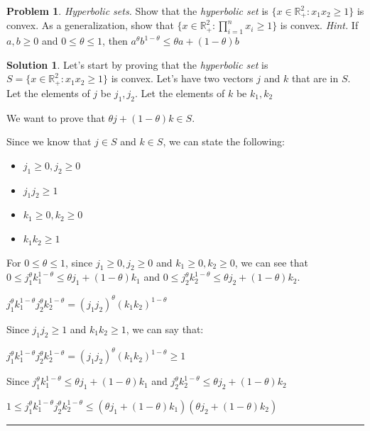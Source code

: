 \documentclass{article}
\theoremstyle{definition}
\newtheorem{problem}{Problem}
\def\fline{\rule{0.75\linewidth}{0.5pt}}
\newcommand{\finishline}{\begin{center}\fline\end{center}}
\newtheorem*{solution*}{Solution}
\newenvironment{solution}{\begin{solution*}}{{\finishline} \end{solution*}}
\begin{document}
\begin{problem}
    \textit{Hyperbolic sets.} Show that the \textit{hyperbolic set} is $\{x \in \mathbb{R}^2_+ : x_1x_2 \geq 1\}$ is convex. As a generalization, show that $\{x \in \mathbb{R}^2_+ : \prod_{i=1}^{n} x_i \geq 1\}$ is convex. \textit{Hint.} If $a, b \geq 0$ and $0 \leq \theta \leq 1$, then $a^{\theta} b^{1 - \theta} \leq \theta a + (1 - \theta) b$

    \begin{solution}

    Let's start by proving that the \textit{hyperbolic set} is $S = \{x \in \mathbb{R}^2_+ : x_1x_2 \geq 1\}$ is convex. \newline 
Let's have two vectors  $j$ and $k$ that are in $S$. Let the elements of $j$ be $j_1, j_2$. Let the elements of $k$ be $k_1, k_2$

We want to prove that $\theta j + (1 - \theta)k \in S$. 

        Since we know that $j \in S$ and $k \in S$, we can state the following:
        \begin{itemize}
            \item $j_1 \geq 0, j_2 \geq 0$
            \item $j_1 j_2 \geq 1$
            \item $k_1 \geq 0, k_2 \geq 0$
            \item $k_1 k_2 \geq 1$
        \end{itemize}

    For $0 \leq \theta \leq 1$, since $j_1 \geq 0, j_2 \geq 0$ and $k_1 \geq 0, k_2 \geq 0$, we can see that $0 \leq j_1^{\theta} k_1^{1 - \theta} \leq \theta j_1 + (1 - \theta)k_1$ and $0 \leq j_2^{\theta} k_2^{1 - \theta} \leq \theta j_2 + (1 - \theta)k_2$. 

    $j_1^{\theta} k_1^{1 - \theta} j_2^{\theta} k_2^{1 - \theta} = (j_1 j_2)^{\theta} (k_1 k_2)^{1 - \theta} $

    Since $j_1 j_2 \geq 1$ and $k_1 k_2 \geq 1$, we can say that: \newline 

    $j_1^{\theta} k_1^{1 - \theta} j_2^{\theta} k_2^{1 - \theta} = (j_1 j_2)^{\theta} (k_1 k_2)^{1 - \theta} \geq 1$

    Since $j_1^{\theta} k_1^{1 - \theta} \leq \theta j_1 + (1 - \theta)k_1$ and $j_2^{\theta} k_2^{1 - \theta} \leq \theta j_2 + (1 - \theta)k_2$

    $1 \leq j_1^{\theta} k_1^{1 - \theta} j_2^{\theta} k_2^{1 - \theta} \leq (\theta j_1 + (1 - \theta)k_1) (\theta j_2 + (1 - \theta)k_2)$


\end{solution}
\end{problem}
\end{document}
